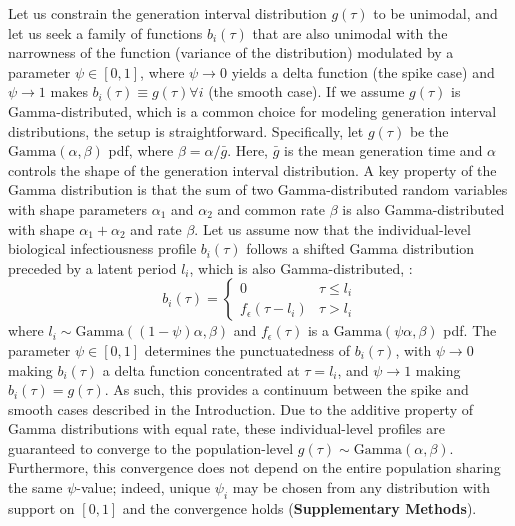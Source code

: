 Let us constrain the generation interval distribution $g(\tau)$ to be unimodal, and let us seek a family of functions $b_i(\tau)$ that are also unimodal with the narrowness of the function (variance of the distribution) modulated by a parameter $\psi \in [0,1]$, where $\psi \rightarrow 0$ yields a delta function (the spike case) and $\psi \rightarrow 1$ makes $b_i(\tau) \equiv g(\tau) \forall i$ (the smooth case). If we assume $g(\tau)$ is Gamma-distributed, which is a common choice for modeling generation interval distributions, the setup is straightforward. Specifically, let $g(\tau)$ be the $\text{Gamma}(\alpha, \beta)$ pdf, where $\beta = \alpha / \bar{g}$. Here, $\bar{g}$ is the mean generation time and $\alpha$ controls the shape of the generation interval distribution. A key property of the Gamma distribution is that the sum of two Gamma-distributed random variables with shape parameters $\alpha_1$ and $\alpha_2$ and common rate $\beta$ is also Gamma-distributed with shape $\alpha_1 + \alpha_2$ and rate $\beta$. Let us assume now that the individual-level biological infectiousness profile $b_i(\tau)$ follows a shifted Gamma distribution preceded by a latent period $l_i$, which is also Gamma-distributed, \ie:
%
\begin{equation}
    b_i(\tau) = \begin{cases}
      0 & \tau \leq l_i  \\
      f_\epsilon(\tau - l_i) & \tau > l_i
    \end{cases}
    \label{eq:gamma_timeshift}
\end{equation}
%
where $l_i \sim \text{Gamma}((1-\psi)\alpha, \beta)$ and $f_\epsilon(\tau)$ is a $\text{Gamma}(\psi \alpha, \beta)$ pdf. The parameter $\psi \in [0,1]$ determines the punctuatedness of $b_i(\tau)$, with $\psi \rightarrow 0$ making $b_i(\tau)$ a delta function concentrated at $\tau = l_i$, and $\psi \rightarrow 1$ making $b_i(\tau) = g(\tau)$. As such, this provides a continuum between the spike and smooth cases described in the Introduction. Due to the additive property of Gamma distributions with equal rate, these individual-level profiles are guaranteed to converge to the population-level $g(\tau) \sim \text{Gamma}(\alpha,\beta)$. Furthermore, this convergence does not depend on the entire population sharing the same $\psi$-value; indeed, unique $\psi_i$ may be chosen from any distribution with support on $[0,1]$ and the convergence holds ({\bf Supplementary Methods}).


